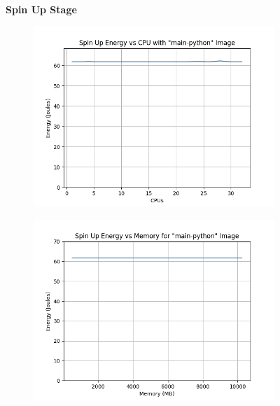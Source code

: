 \documentclass[times, 10pt,twocolumn]{article}
\begin{document}
 \begin{figure}[ht]
   \centering
   \textbf{Spin Up Stage}\par\medskip
   \begin{subfigure}[b]{0.3\textwidth}
     \includegraphics[width=\textwidth]{imgs/container_study/spin_up_vs_cpu.png}
     \caption{}
     \label{fig:spin_up_cpu}
   \end{subfigure}
   \hfill
   \begin{subfigure}[b]{0.3\textwidth}
      \includegraphics[width=\textwidth]{imgs/container_study/spin_up_vs_mem.png}
     \caption{}
     \label{fig:spin_up_mem}
   \end{subfigure}
   \hfill
   \begin{subfigure}[b]{0.3\textwidth}

\end{subfigure}
\end{figure}
\end{document}
